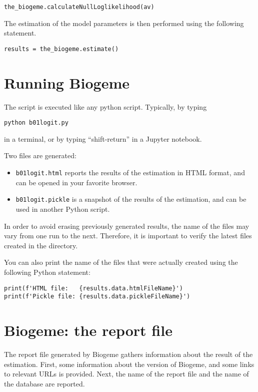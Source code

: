 \documentclass[12pt,a4paper]{article}
\begin{document}
\begin{lstlisting}
the_biogeme.calculateNullLoglikelihood(av)
\end{lstlisting}

The estimation of the model parameters is then performed using the
following statement. 

\begin{lstlisting}
results = the_biogeme.estimate()
\end{lstlisting}


\section{Running Biogeme}

The script is executed like any python script. Typically, by typing
\begin{lstlisting}
python b01logit.py
\end{lstlisting}
in a terminal, or by typing ``shift-return'' in a Jupyter notebook.

Two files are generated:
\begin{itemize}
\item \lstinline+b01logit.html+ reports the results of the estimation
  in HTML format, and can be opened in your favorite browser. 
\item \lstinline+b01logit.pickle+ is a snapshot of the results of the
estimation, and can be used in another Python script. 
\end{itemize}

In order to avoid erasing previously generated results, the name of
the files may vary from one run to the next. Therefore,
it is important to verify the latest files created in the directory. 

You can also print the name of the files that were actually
created using the following Python statement:
\begin{lstlisting}
print(f'HTML file:   {results.data.htmlFileName}')
print(f'Pickle file: {results.data.pickleFileName}')
\end{lstlisting}
\clearpage

\section{Biogeme: the report file}
\label{sec:pythonreport}

The report file generated by Biogeme gathers information
about the result of the estimation. First, some information about the
version of Biogeme, and some links to relevant URLs is provided. 
Next, the name of the report file and the name of the database  are reported. 
\end{document}
